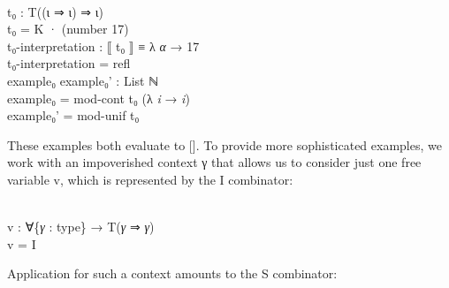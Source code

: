 \documentclass{entcs} \usepackage{prentcsmacro}
\newcommand{\AgdaFontStyle}[1]{\textsf{#1}}
\newcommand{\AgdaBoundFontStyle}[1]{\textit{#1}}
\newcommand{\AgdaNumber}      [1]{\textcolor{AgdaNumber}{#1}}
\newcommand{\AgdaSymbol}      [1]{\textcolor{AgdaSymbol}{#1}}
\newcommand{\AgdaBound}    [1]{\AgdaBoundFontStyle{\textcolor{AgdaBound}{#1}}}
\newcommand{\AgdaInductiveConstructor}[1]
    {\AgdaFontStyle{\textcolor{AgdaInductiveConstructor}{#1}}}
\newcommand{\AgdaDatatype} [1]{\AgdaFontStyle{\textcolor{AgdaDatatype}{#1}}}
\newcommand{\AgdaFunction} [1]{\AgdaFontStyle{\textcolor{AgdaFunction}{#1}}}
\newcommand{\AgdaCodeStyle}{\small}
\newenvironment{code}%
{\noindent\AgdaCodeStyle\pboxed}%
{\endpboxed\par\noindent%
\ignorespacesafterend}
\begin{document}
\begin{code}\>\<%
\\
\>\AgdaFunction{t₀} \AgdaSymbol{:} \AgdaDatatype{T}\AgdaSymbol{((}\AgdaInductiveConstructor{ι} \AgdaInductiveConstructor{⇒} \AgdaInductiveConstructor{ι}\AgdaSymbol{)} \AgdaInductiveConstructor{⇒} \AgdaInductiveConstructor{ι}\AgdaSymbol{)}\<%
\\
\>\AgdaFunction{t₀} \AgdaSymbol{=} \AgdaInductiveConstructor{K} \AgdaInductiveConstructor{·} \AgdaSymbol{(}\AgdaFunction{number} \AgdaNumber{17}\AgdaSymbol{)}\<%
\\
\>\AgdaFunction{t₀-interpretation} \AgdaSymbol{:} \AgdaFunction{⟦} \AgdaFunction{t₀} \AgdaFunction{⟧} \AgdaDatatype{≡} \AgdaSymbol{λ} \AgdaBound{α} \AgdaSymbol{→} \AgdaNumber{17}\<%
\\
\>\AgdaFunction{t₀-interpretation} \AgdaSymbol{=} \AgdaInductiveConstructor{refl}\<%
\\
\>\AgdaFunction{example₀} \AgdaFunction{example₀'} \AgdaSymbol{:} \AgdaDatatype{List} \AgdaDatatype{ℕ}\<%
\\
\>\AgdaFunction{example₀} \AgdaSymbol{=} \AgdaFunction{mod-cont} \AgdaFunction{t₀} \AgdaSymbol{(λ} \AgdaBound{i} \AgdaSymbol{→} \AgdaBound{i}\AgdaSymbol{)}\<%
\\
\>\AgdaFunction{example₀'} \AgdaSymbol{=} \AgdaFunction{mod-unif} \AgdaFunction{t₀}\<%
\\
\>\<\end{code} 
These examples both evaluate to [].  To provide more sophisticated
examples, we work with an impoverished context γ that allows us to
consider just one free variable v, which is represented by the I
combinator:

\begin{code}\>\<%
\\
\>\AgdaFunction{v} \AgdaSymbol{:} \AgdaSymbol{∀\{}\AgdaBound{γ} \AgdaSymbol{:} \AgdaDatatype{type}\AgdaSymbol{\}} \AgdaSymbol{→} \AgdaDatatype{T}\AgdaSymbol{(}\AgdaBound{γ} \AgdaInductiveConstructor{⇒} \AgdaBound{γ}\AgdaSymbol{)}\<%
\\
\>\AgdaFunction{v} \AgdaSymbol{=} \AgdaFunction{I}\<%
\\
\>\<\end{code}
Application for such a context amounts to the S combinator:
\end{document}

